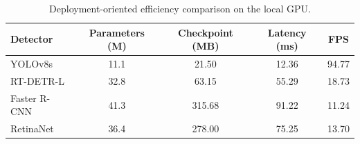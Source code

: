 \begin{table}[t]
    \centering
    \caption{Deployment-oriented efficiency comparison on the local GPU.}
    \label{tab:efficiency}
    \begin{tabular}{lcccc}
        \toprule
        Detector & Parameters (M) & Checkpoint (MB) & Latency (ms) & FPS \\
        \midrule
        YOLOv8s & 11.1 & 21.50 & 12.36 & 94.77 \\
        RT-DETR-L & 32.8 & 63.15 & 55.29 & 18.73 \\
        Faster R-CNN & 41.3 & 315.68 & 91.22 & 11.24 \\
        RetinaNet & 36.4 & 278.00 & 75.25 & 13.70 \\
        \bottomrule
    \end{tabular}
\end{table}

